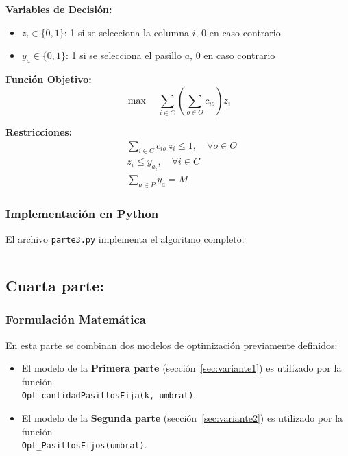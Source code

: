 \documentclass[a4paper,12pt]{article}
\begin{document}
\textbf{Variables de Decisión:}
\begin{itemize}
    \item $z_i \in \{0,1\}$: 1 si se selecciona la columna $i$, 0 en caso contrario
    \item $y_a \in \{0,1\}$: 1 si se selecciona el pasillo $a$, 0 en caso contrario
\end{itemize}

\textbf{Función Objetivo:}
\begin{equation}
\max \quad \sum_{i \in C} \left(\sum_{o \in O} c_{io}\right) z_i
\end{equation}

\textbf{Restricciones:}
\begin{align}
&\sum_{i \in C} c_{io} \, z_i \leq 1, \quad \forall o \in O \\
&z_i \leq y_{a_i}, \quad \forall i \in C \\
&\sum_{a \in P} y_a = M
\end{align}


\subsubsection{Implementación en Python}

El archivo \texttt{parte3.py} implementa el algoritmo completo:

\begin{lstlisting}[language=Python, caption=Algoritmo principal de generación de columnas]

\end{lstlisting}

\clearpage

\subsection{Cuarta parte:}
\label{sec:variante4}


\subsubsection{Formulación Matemática}

En esta parte se combinan dos modelos de optimización previamente definidos:

\begin{itemize}
    \item El modelo de la \textbf{Primera parte} (sección~\ref{sec:variante1}) es utilizado por la función \\ \texttt{Opt\_cantidadPasillosFija(k, umbral)}. 
    \item El modelo de la \textbf{Segunda parte} (sección~\ref{sec:variante2}) es utilizado por la función \\ \texttt{Opt\_PasillosFijos(umbral)}.
\end{itemize}
\end{document}
